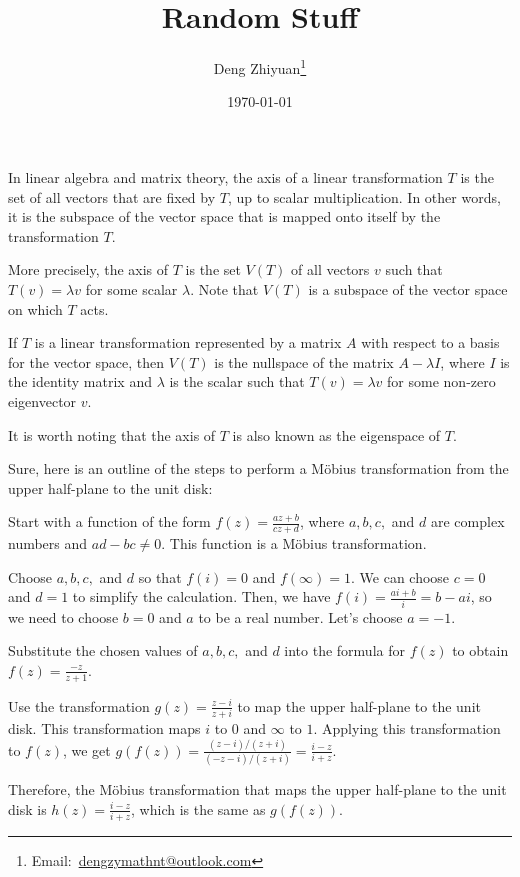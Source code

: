 \documentclass[12pt,a4paper,english]{article}
\title{Random Stuff}
\date{\today}
\author{Deng Zhiyuan\footnote{Email:\ \href{mailto:dengzymathnt@outlook.com}{dengzymathnt@outlook.com}}}
\theoremstyle{plain}
\theoremstyle{definition}
\theoremstyle{remark}
\begin{document}
\maketitle
\newpage
In linear algebra and matrix theory, the axis of a linear transformation $T$ is the set of all vectors that are fixed by $T$, up to scalar multiplication. In other words, it is the subspace of the vector space that is mapped onto itself by the transformation $T$.

More precisely, the axis of $T$ is the set $V(T)$ of all vectors $v$ such that $T(v) = \lambda v$ for some scalar $\lambda$. Note that $V(T)$ is a subspace of the vector space on which $T$ acts.

If $T$ is a linear transformation represented by a matrix $A$ with respect to a basis for the vector space, then $V(T)$ is the nullspace of the matrix $A - \lambda I$, where $I$ is the identity matrix and $\lambda$ is the scalar such that $T(v) = \lambda v$ for some non-zero eigenvector $v$.

It is worth noting that the axis of $T$ is also known as the eigenspace of $T$.

Sure, here is an outline of the steps to perform a Möbius transformation from the upper half-plane to the unit disk:

Start with a function of the form $f(z) = \frac{az + b}{cz + d}$, where $a,b,c,$ and $d$ are complex numbers and $ad-bc\neq 0$. This function is a Möbius transformation.

Choose $a,b,c,$ and $d$ so that $f(i) = 0$ and $f(\infty) = 1$. We can choose $c = 0$ and $d = 1$ to simplify the calculation. Then, we have $f(i) = \frac{ai+b}{i} = b - ai$, so we need to choose $b = 0$ and $a$ to be a real number. Let's choose $a = -1$.

Substitute the chosen values of $a,b,c,$ and $d$ into the formula for $f(z)$ to obtain $f(z) = \frac{-z}{z + 1}$.

Use the transformation $g(z) = \frac{z-i}{z+i}$ to map the upper half-plane to the unit disk. This transformation maps $i$ to $0$ and $\infty$ to $1$. Applying this transformation to $f(z)$, we get $g(f(z)) = \frac{(z-i)/(z+i)}{(-z-i)/(z+i)} = \frac{i-z}{i+z}$.

Therefore, the Möbius transformation that maps the upper half-plane to the unit disk is $h(z) = \frac{i-z}{i+z}$, which is the same as $g(f(z))$.
\end{document}
